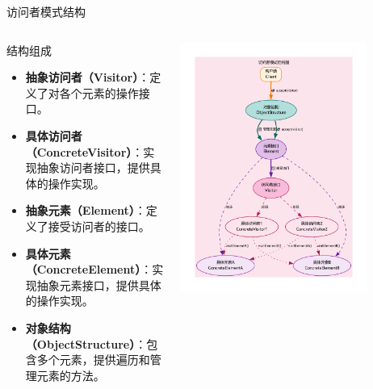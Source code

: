 \documentclass[UTF8,aspectratio=169]{beamer}
\begin{document}
\begin{frame}{访问者模式结构}
    \begin{columns}
        \begin{column}{0.38\textwidth}
            \begin{ytublock}{结构组成}
                \begin{itemize}
                    \item \textbf{抽象访问者（Visitor）}：定义了对各个元素的操作接口。
                    \item \textbf{具体访问者（ConcreteVisitor）}：实现抽象访问者接口，提供具体的操作实现。
                    \item \textbf{抽象元素（Element）}：定义了接受访问者的接口。
                    \item \textbf{具体元素（ConcreteElement）}：实现抽象元素接口，提供具体的操作实现。
                    \item \textbf{对象结构（ObjectStructure）}：包含多个元素，提供遍历和管理元素的方法。
                \end{itemize}
            \end{ytublock}
        \end{column}
        \begin{column}{0.58\textwidth}
            \begin{center}
                \includegraphics[width=0.8\textwidth]{images/visitor_pattern.pdf}
            \end{center}
        \end{column}
    \end{columns}
\end{frame}
\end{document}
